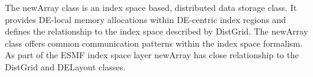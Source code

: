 
The newArray class is an index space based, distributed data storage class. It provides DE-local memory allocations within DE-centric index regions and defines the relationship to the index space described by DistGrid. The newArray class offers common communication patterns within the index space formalism. As part of the ESMF index space layer newArray has close relationship to the DistGrid and DELayout classes.
